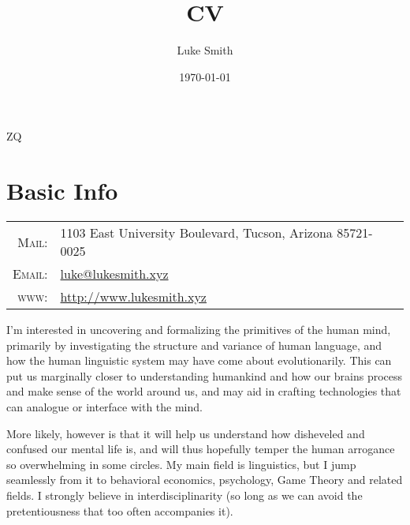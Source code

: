 ZQ\documentclass[letterpaper,10pt]{article}
\title{CV}
\author{Luke Smith}
\date{\today}
\begin{document}

\par{\par}

\section{Basic Info}

\begin{tabular}{rl}
    \textsc{Mail:}   & 1103 East University Boulevard, Tucson, Arizona 85721-0025 \\
    \textsc{Email:}     & \href{mailto:luke@lukesmith.xyz}{luke@lukesmith.xyz}\\
    \textsc{www:}&\href{http://www.lukesmith.xyz}{http://www.lukesmith.xyz}
\end{tabular}

\vspace{.25cm}

\noindent I'm interested in uncovering and formalizing the primitives of the human mind, primarily by investigating the structure and variance of human language, and how the human linguistic system may have come about evolutionarily. This can put us marginally closer to understanding humankind and how our brains process and make sense of the world around us, and may aid in crafting technologies that can analogue or interface with the mind.

\vspace{.25cm}

\noindent More likely, however is that it will help us understand how disheveled and confused our mental life is, and will thus hopefully temper the human arrogance so overwhelming in some circles. My main field is linguistics, but I jump seamlessly from it to behavioral economics, psychology, Game Theory and related fields. I strongly believe in interdisciplinarity (so long as we can avoid the pretentiousness that too often accompanies it).
\end{document}
